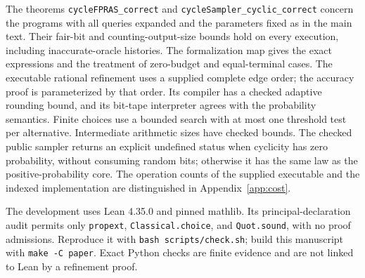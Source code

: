 \documentclass[11pt]{article}
\begin{document}
The theorems \texttt{cycleFPRAS\_correct} and
\texttt{cycleSampler\_cyclic\_correct} concern the programs with all
queries expanded and the parameters fixed as in the main text.
Their fair-bit and counting-output-size bounds hold on every execution,
including inaccurate-oracle histories.
The formalization map gives the exact expressions and the treatment of
zero-budget and equal-terminal cases. The executable rational refinement
uses a supplied complete edge order; the accuracy proof is parameterized
by that order. Its compiler has a checked adaptive rounding bound, and its
bit-tape interpreter agrees with the probability semantics. Finite choices
use a bounded search with at most one threshold test per alternative.
Intermediate arithmetic sizes have checked bounds. The checked public sampler
returns an explicit undefined status when cyclicity has zero probability,
without consuming random bits; otherwise it has the same law as the
positive-probability core. The operation counts of the supplied executable
and the indexed implementation are distinguished in Appendix~\ref{app:cost}.

The development uses Lean 4.35.0 and pinned mathlib. Its principal-declaration
audit permits only \texttt{propext}, \texttt{Classical.choice}, and
\texttt{Quot.sound}, with no proof admissions. Reproduce it with
\texttt{bash scripts/check.sh}; build this manuscript with
\texttt{make -C paper}. Exact Python checks are finite evidence and are
not linked to Lean by a refinement proof.
\end{document}
